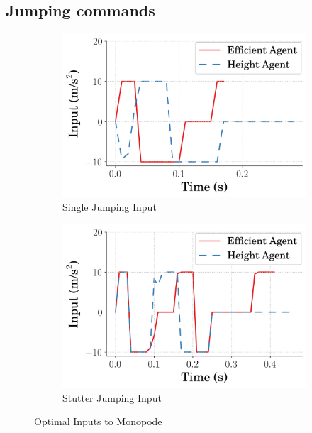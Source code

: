 \subsection{Jumping commands}
\label{subsection:opt_input_performance}
% 
\begin{figure}[tb!]
    \centering
    \begin{subfigure}{.49\textwidth}
      \centering
      \includegraphics[width=\linewidth]{Figures/Ch2/best_One_Input_.png}
      \caption{Single Jumping Input}
      \label{fig:opt_one_input}
    \end{subfigure}%
    \hfill
    \begin{subfigure}{.49\textwidth}
      \centering
      \includegraphics[width=\linewidth]{Figures/Ch2/best_Stutter_Input_.png}
       \caption{Stutter Jumping Input}
       \label{fig:opt_stutter_input}
    \end{subfigure}
     \caption{Optimal Inputs to Monopode}
     \label{fig:opt_input}
\end{figure}
% 

